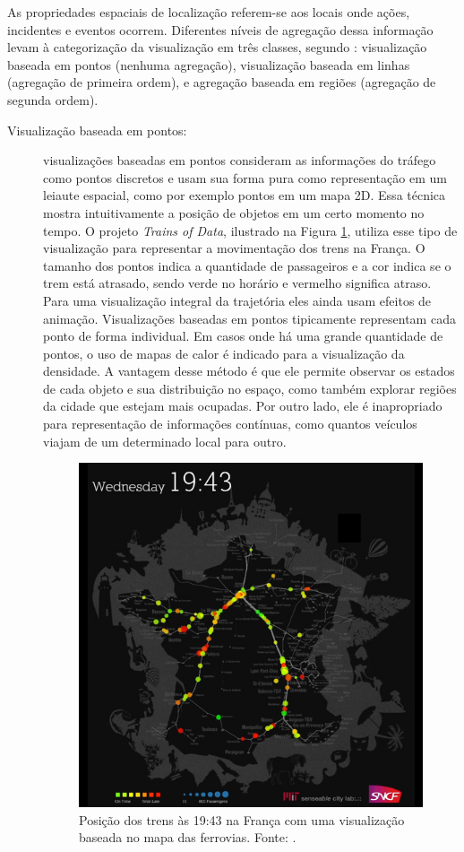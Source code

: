   As propriedades espaciais de localização referem-se aos locais onde ações,
incidentes e eventos ocorrem. Diferentes níveis de agregação dessa informação
levam à categorização da visualização em três classes, segundo
\citet{Chen2015}: visualização baseada em pontos (nenhuma agregação),
visualização baseada em linhas (agregação de primeira ordem), e agregação
baseada em regiões (agregação de segunda ordem).

\begin{description}
  \item[Visualização baseada em pontos:] visualizações baseadas em pontos
consideram as informações do tráfego como pontos discretos e usam sua forma
pura como representação em um leiaute espacial, como por exemplo pontos em um mapa 2D. Essa técnica
mostra intuitivamente a posição de objetos em um certo momento no tempo. O
projeto \emph{Trains of Data}, ilustrado na Figura \ref{fig:trains-of-data},
utiliza esse tipo de visualização para representar a movimentação dos trens na
França. O tamanho dos pontos indica a quantidade de passageiros e a cor indica
se o trem está atrasado, sendo verde no horário e vermelho significa atraso.
Para uma visualização integral da trajetória eles ainda usam efeitos de
animação. Visualizações baseadas em pontos tipicamente representam cada ponto
de forma individual. Em casos onde há uma grande quantidade de pontos, o uso de
mapas de calor é indicado para a visualização da densidade. A vantagem desse
método é que ele permite observar os estados de cada objeto e sua distribuição
no espaço, como também explorar regiões da cidade que estejam mais ocupadas.
Por outro lado, ele é inapropriado para representação de informações contínuas,
como quantos veículos viajam de um determinado local para outro.

\begin{figure}[!htb]
  \centering
  \includegraphics[width=.6\textwidth]{../figuras/trains-of-data.jpg}
  \caption[Visualização baseada no mapa das ferrovias da França]{Posição dos trens às 19:43 na França com uma visualização baseada no mapa
das ferrovias. Fonte: \citet{Senseable2018}.}
  \label{fig:trains-of-data}
\end{figure}


\end{description}

